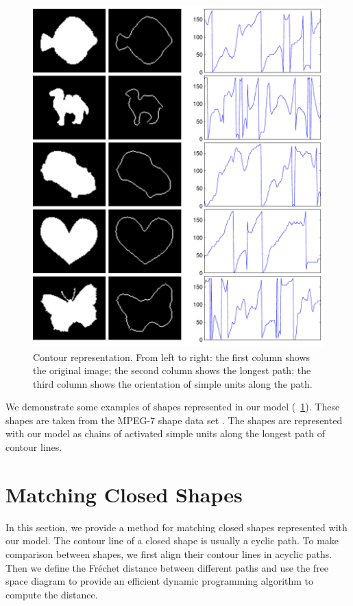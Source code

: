 \documentclass[10pt,letterpaper]{article}
\begin{document}
\begin{figure}[ht]
\begin{center}
\includegraphics[width=0.99\linewidth]{images/fig6.pdf}
\end{center}
\caption{Contour representation. 
From left to right: the first column shows the original image;
the second column shows the longest path;
the third column shows the orientation of simple units along the path.} 
\label{fig:6}
\end{figure}

We demonstrate some examples of shapes represented in our model (\figurename~\ref{fig:6}).
These shapes are taken from the MPEG-7 shape data set \cite{jeannin1999}.
The shapes are represented with our model as chains of activated simple units
along the longest path of contour lines.

\section{Matching Closed Shapes}

In this section, we provide a method for matching closed shapes represented with our model.
The contour line of a closed shape is usually a cyclic path.
To make comparison between shapes, we first align their contour lines in acyclic paths.
Then we define the Fr\'echet distance \cite{alt1995} between different paths
and use the free space diagram \cite{alt2003}
to provide an efficient dynamic programming algorithm to compute the distance.
\end{document}
